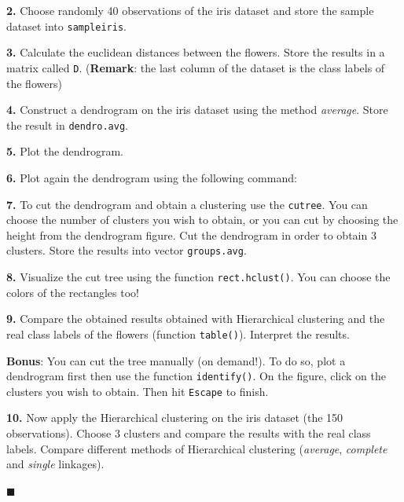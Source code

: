 \documentclass[]{book}
\newenvironment{Shaded}{\begin{snugshade}}{\end{snugshade}}
\newcommand{\KeywordTok}[1]{\textcolor[rgb]{0.13,0.29,0.53}{\textbf{#1}}}
\newcommand{\DataTypeTok}[1]{\textcolor[rgb]{0.13,0.29,0.53}{#1}}
\newcommand{\DecValTok}[1]{\textcolor[rgb]{0.00,0.00,0.81}{#1}}
\newcommand{\OperatorTok}[1]{\textcolor[rgb]{0.81,0.36,0.00}{\textbf{#1}}}
\newcommand{\NormalTok}[1]{#1}
\theoremstyle{definition}
\theoremstyle{definition}
\theoremstyle{definition}
\theoremstyle{remark}
\begin{document}
\textbf{2.} Choose randomly 40 observations of the iris dataset and
store the sample dataset into \texttt{sampleiris}.

\textbf{3.} Calculate the euclidean distances between the flowers. Store
the results in a matrix called \texttt{D}. (\textbf{Remark}: the last
column of the dataset is the class labels of the flowers)

\textbf{4.} Construct a dendrogram on the iris dataset using the method
\emph{average}. Store the result in \texttt{dendro.avg}.

\textbf{5.} Plot the dendrogram.

\textbf{6.} Plot again the dendrogram using the following command:

\begin{Shaded}
\end{Shaded}

\textbf{7.} To cut the dendrogram and obtain a clustering use the
\texttt{cutree}. You can choose the number of clusters you wish to
obtain, or you can cut by choosing the height from the dendrogram
figure. Cut the dendrogram in order to obtain 3 clusters. Store the
results into vector \texttt{groups.avg}.

\textbf{8.} Visualize the cut tree using the function
\texttt{rect.hclust()}. You can choose the colors of the rectangles too!

\textbf{9.} Compare the obtained results obtained with Hierarchical
clustering and the real class labels of the flowers (function
\texttt{table()}). Interpret the results.

\textbf{Bonus}: You can cut the tree manually (on demand!). To do so,
plot a dendrogram first then use the function \texttt{identify()}. On
the figure, click on the clusters you wish to obtain. Then hit
\texttt{Escape} to finish.

\textbf{10.} Now apply the Hierarchical clustering on the iris dataset
(the 150 observations). Choose 3 clusters and compare the results with
the real class labels. Compare different methods of Hierarchical
clustering (\emph{average}, \emph{complete} and \emph{single} linkages).

◼

\appendix {}
\end{document}
